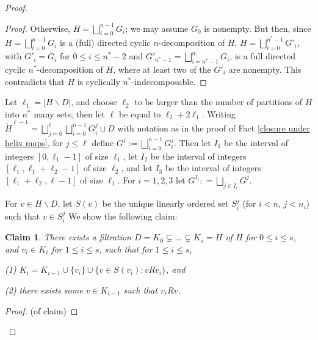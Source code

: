 \documentclass{amsart}
\newtheorem{claim}[theorem]{Claim}
\theoremstyle{definition}
\theoremstyle{remark}
\numberwithin{equation}{section}
\begin{document}
\begin{proof}
\begin{proof}
    Otherwise, $H= \bigsqcup^{n-1}_{i =0} G_{i}$; we may assume $G_{0}$ is nonempty. But then, since $H= \bigsqcup^{n-1}_{i =0} G_{i}$ is a (full) directed cyclic $n$-decomposition of $H$, $H= \bigsqcup^{n^{*}-1}_{i =0} G'_{i}$, with $G'_{i} = G_{i}$ for $0 \leq i \leq n^{*}-2$ and $G'_{n^{*}-1}= \bigsqcup^{n}_{i=n^{*}-1} G_{i}$, is a full directed cyclic $n^{*}$-decomposition of $H$, where at least two of the $G'_{i}$ are nonempty. This contradicts that $H$ is cyclically $n^{*}$-indecomposable.
\end{proof}



Let $\ell_{1}= |H \backslash D|$, and choose $\ell_{2} $ to be larger than the number of partitions of $H$ into $n^{*}$ many sets; then let $\ell$ be equal to $\ell_{2} + 2\ell_{1}$. Writing $\tilde{H}^{\ell-1} = \bigsqcup^{\ell}_{j =0}\bigsqcup^{n-1}_{i = 0} G^{j}_{i} \sqcup D$ with notation as in the proof of Fact \ref{closure under helix maps}, for $j \leq \ell$ define $G^{j} := \bigsqcup^{n-1}_{i = 0} G^{j}_{i}$. Then let $I_{1}$ be the interval of integers $[0, \ell_{1} -1]$ of size $\ell_{1}$, let $I_{2}$ be the interval of integers $[\ell_{1}, \ell_{1} + \ell_{2} -1]$ of size $\ell_{2}$, and let $I_{3}$ be the interval of integers $[\ell_{1}+\ell_{2}, \ell-1]$ of size $\ell_{1}$. For $i = 1, 2, 3$ let $G^{I_{i}} : = \bigsqcup_{j \in I_{i}} G^{j}$.


For $v \in H \backslash D$, let $S(v)$ be the unique linearly ordered set $S^{j}_{i}$ (for $i < n$, $j < n_{i}$) such that $v \in S^{j}_{i}$ We show the following claim:

\begin{claim}\label{graph filtration}
There exists a filtration $D = K_{0} \subsetneq \ldots \subsetneq K_{s} = H$ of $H$ for $0 \leq i \leq s$, and $v_{i} \in K_{i}$ for $1 \leq i \leq s$, such that for $1 \leq i \leq s$,

(1) $K_{i}=K_{i-1}\cup\{v_{i}\} \cup \{v\in S(v_{i}): vRv_{i}\}$, and

(2) there exists some $v \in K_{i-1}$ such that $v_{i} R v$.






    
\end{claim}

\begin{proof}(of claim)


\end{proof}
\end{proof}
\end{document}
